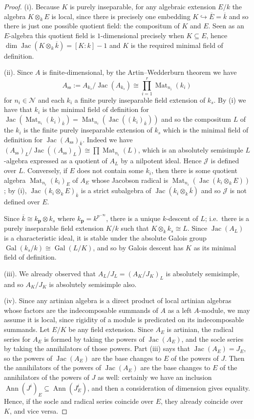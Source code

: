 \documentclass[11pt,reqno]{amsart}
\theoremstyle{definition}
\theoremstyle{remark}
\theoremstyle{definition}
\theoremstyle{plain}
\DeclareMathOperator{\Gal}{Gal}
\DeclareMathOperator{\Mat}{Mat}
\DeclareMathOperator{\Ann}{Ann}
\DeclareMathOperator{\Jac}{Jac}
\newcommand{\kp}{k_{\mathbf{p}}}
\newcommand{\N}{\mathcal{N}}
\newcommand{\bark}{{\overline{k}}}
\begin{document}
\begin{proof}
  (i). Because $K$ is purely inseparable, for any algebraic extension $E/k$ the algebra $K\otimes_k E$ is local, since there is precisely one embedding $K\hookrightarrow \overline{E}=\bark$ and so there is just one possible quotient field: the compositum of $K$ and $E$. 
  Seen as an $E$-algebra this quotient field is $1$-dimensional precisely when $K\subseteq E$, hence $\dim \Jac(K\otimes_k \bark)=[K:k]-1$ and $K$ is the required minimal field of definition.
  
(ii). Since $A$ is finite-dimensional, by the Artin--Wedderburn theorem we have $$A_{\text{ss}}:=A_{k_s}/\Jac(A_{k_s})\cong\prod_{i=1}^r\Mat_{n_i}(k_i)$$ for $n_i\in\N$ and each $k_i$ a finite purely inseparable field extension of $k_s$. By (i) we have that $k_i$ is the minimal field of definition for $\Jac(\Mat_{n_i}(k_i)_\bark)=\Mat_{n_i}(\Jac((k_i)_\bark))$ and so the compositum $L$ of the $k_i$ is the finite purely inseparable extension of $k_s$ which is the minimal field of definition for $\Jac(A_{\text{ss}})_\bark$. Indeed we have $(A_{\text{ss}})_L/\Jac((A_{\text{ss}})_L)\cong\prod\Mat_{n_i}(L)$, which is an absolutely semisimple $L$-algebra expressed as a quotient of $A_L$ by a nilpotent ideal. Hence $\mathcal{J}$ is defined over $L$. Conversely, if $E$ does not contain some $k_i$, then there is some quotient algebra $\Mat_{n_i}(k_i)_E$ of $A_E$ whose Jacobson radical is $\Mat_{n_i}(\Jac(k_i\otimes_k E))$; by (i), $\Jac(k_i\otimes_k E)_\bark$ is a strict subalgebra of $\Jac(k_i\otimes_k \bark)$ and so $\mathcal{J}$ is not defined over $E$.

Since $\bark\cong \kp\otimes k_s$ where $\kp=k^{p^{-\infty}}$, there is a unique $k$-descent of $L$; i.e.~there is a purely inseparable field extension $K/k$ such that $K\otimes_k k_s\cong L$. Since $\Jac(A_L)$ is a characteristic ideal, it is stable under the absolute Galois group $\Gal(k_s/k)\cong\Gal(L/K)$, and so by Galois descent has $K$ as its minimal field of definition. 

(iii). We already observed that $A_L/J_L=(A_K/J_K)_L$ is absolutely semisimple, and so $A_K/J_K$ is absolutely semisimple also. 

(iv). Since any artinian algebra is a direct product of local artinian algebras whose factors are the indecomposable summands of $A$ as a left $A$-module, we may assume it is local, since rigidity of a module is predicated on its indecomposable summands. Let $E/K$ be any field extension.
Since $A_E$ is artinian, the radical series for $A_E$ is formed by taking the powers of $\Jac(A_E)$, and the socle series by taking the annihilators of those powers.
Part (iii) says that $\Jac(A_E) = J_E$, so the powers of $\Jac(A_E)$ are the base changes to $E$ of the powers of $J$.
Then the annihilators of the powers of $\Jac(A_E)$ are the base changes to $E$ of the annihilators of the powers of $J$ as well: certainly we have an inclusion $\Ann(J^i)_E \subseteq \Ann(J_E^i)$, and then a consideration of dimension gives equality.  
Hence, if the socle and radical series coincide over $E$, they already coincide over $K$, and vice versa.
\end{proof}
\end{document}
